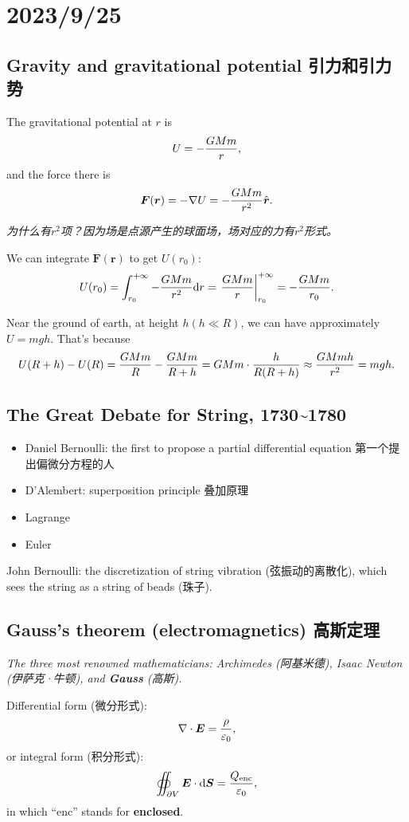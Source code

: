 \chapter{2023/9/25}\label{20230925}

\section{Gravity and gravitational potential 引力和引力势}\label{gravity-and-gravitational-potential-ux5f15ux529bux548cux5f15ux529bux52bf}

The gravitational potential at \(r\) is \[U = - {GMm \over r},\] and the force there is \[\boldsymbol F(\boldsymbol r) = - \nabla U = - {GMm \over r^2} \hat {\boldsymbol r}.\]

\emph{为什么有\(r^2\)项？因为场是点源产生的球面场，场对应的力有\(r^2\)形式。}

We can integrate \(\boldsymbol F(\boldsymbol r)\) to get \(U(r_0)\): \[U(r_0) = \int^{+\infty}_{r_0} -{GMm \over r^2} \mathrm dr = \left.{GMm \over r} \right\vert^{+\infty}_{r_0} = -{GMm \over r_0}.\]

Near the ground of earth, at height \(h(h \ll R)\), we can have approximately \(U=mgh\). That's because \[U(R+h)- U(R)  = {GMm \over R} - {GMm \over R+h} = GMm \cdot {h \over R(R+h)} \approx {GMmh \over r^2} = mgh.\]

\section{The Great Debate for String, 1730\textasciitilde1780}\label{the-great-debate-for-string-17301780}

\begin{itemize}
\tightlist{}
\item
  Daniel Bernoulli: the first to propose a partial differential equation
  第一个提出偏微分方程的人
\item
  D'Alembert: superposition principle 叠加原理
\item
  Lagrange
\item
  Euler
\end{itemize}

John Bernoulli: the discretization of string vibration (弦振动的离散化), which sees the string as a string of beads (珠子).

\section{Gauss's theorem (electromagnetics) 高斯定理}\label{gausss-theorem-electromagnetics-ux9ad8ux65afux5b9aux7406}

\emph{The three most renowned mathematicians: Archimedes (阿基米德), Isaac Newton (伊萨克·牛顿), and \textbf{Gauss} (高斯).}

Differential form (微分形式): \[\nabla \cdot \boldsymbol E = {\rho \over \varepsilon_0}, \] or integral form (积分形式): \[\oiint_{\partial V} \boldsymbol E \cdot \mathrm d \boldsymbol S = {Q_{\mathrm{enc}} \over \varepsilon_0},\] in which ``\(\mathrm {enc}\)'' stands for \textbf{enclosed}.
